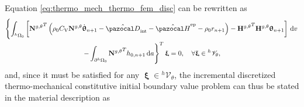 Equation \eqref{eq:thermo_mech_thermo_fem_disc} can be rewritten as
\begin{multline}
  \left\{\int_{^h\Omega_0}   \left[{\mathbf N^{g,\theta}}^T \left(\rho_0C_\mathrm{V}\mathbf N^{g,\theta}\dot{\bm \uptheta}_{n+1} -\hat{\pazocal D}_\text{int} - \hat{\pazocal H}^\text{ep}- \rho_0 r_{n+1} \right) - {\mathbf H^{g,\theta}}^T\mathbf H^{g,\theta} {\bm\uptheta}_{n+1} \right]\ud v\right. \\ \left.- \int_{\partial{}^h\Omega_0} {\mathbf N^{g,\theta}}^T h_{0,n+1}\ud a\right\}^T \bm \upxi= 0,\quad \forall \bm{\upxi} \in {}^h\mathscr{V}_{\theta}, \label{eq:thermo_mech_thermo_fem_disc}
\end{multline}
and, since it must be satisfied for any $\bm \upxi \in {}^h \mathscr{V}_\theta$, the incremental discretized thermo-mechanical constitutive initial boundary value problem can thus be stated in the material description as
